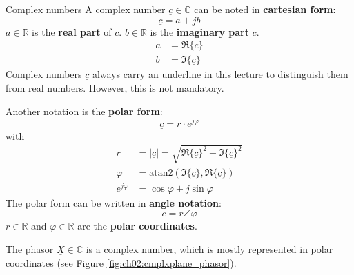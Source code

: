 \begin{refsection}
\begin{excursus}{Complex numbers}
	A complex number $\underline{c} \in \mathbb{C}$ can be noted in  \textbf{cartesian form}:
	\begin{equation}
		\underline{c} = a + j b
	\end{equation}
	$a \in \mathbb{R}$ is the  \textbf{real part} of $\underline{c}$. $b \in \mathbb{R}$ is the  \textbf{imaginary part} $\underline{c}$.
	\begin{subequations}
		\begin{align}
			a &= \Re\{\underline{c}\} \\
			b &= \Im\{\underline{c}\}
		\end{align}
	\end{subequations}%
	Complex numbers $\underline{c}$ always carry an underline in this lecture to distinguish them from real numbers. However, this is not mandatory.

	Another notation is the  \textbf{polar form}:
	\begin{equation}
		\underline{c} = r \cdot e^{j \varphi}
	\end{equation}
	with
	\begin{subequations}
		\begin{align}
			r &= |\underline{c}| = \sqrt{\Re\{\underline{c}\}^2 + \Im\{\underline{c}\}^2} \\
			\varphi &= \mathrm{atan2} \left(\Im\{\underline{c}\}, \Re\{\underline{c}\}\right) \\
			e^{j \varphi} &= \cos \varphi + j \sin \varphi
		\end{align}
	\end{subequations}
	The polar form can be written in  \textbf{angle notation}:
	\begin{equation}
		\underline{c} = r \angle \varphi
	\end{equation}
	$r \in \mathbb{R}$ and $\varphi \in \mathbb{R}$ are the  \textbf{polar coordinates}.
\end{excursus}

The phasor $\underline{X} \in \mathbb{C}$ is a complex number, which is mostly represented in polar coordinates (see Figure \ref{fig:ch02:cmplxplane_phasor}).

\begin{figure}[H]
	\centering
\end{figure}
\end{refsection}
